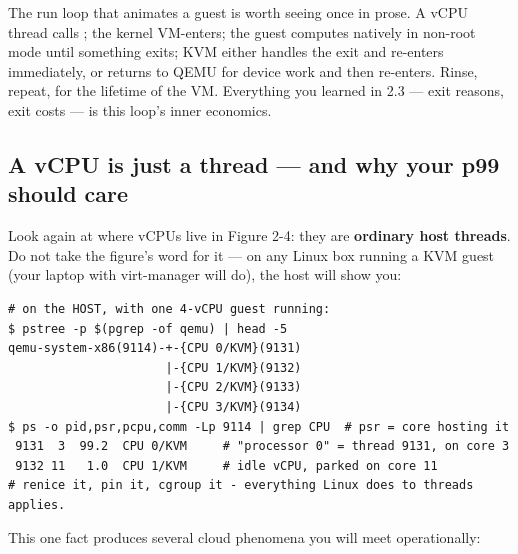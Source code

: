 The run loop that animates a guest is worth seeing once in prose. A vCPU thread calls ; the kernel VM-enters; the guest computes natively in non-root mode until something exits; KVM either handles the exit and re-enters immediately, or returns to QEMU for device work and then re-enters. Rinse, repeat, for the lifetime of the VM. Everything you learned in 2.3 — exit reasons, exit costs — is this loop's inner economics.

\subsection*{A vCPU is just a thread — and why your p99 should care}

Look again at where vCPUs live in Figure 2-4: they are \textbf{ordinary host threads}. Do not take the figure's word for it — on any Linux box running a KVM guest (your laptop with virt-manager will do), the host will show you:

\begin{terminalbox}
\begin{Verbatim}[breaklines=true,breakanywhere=true,fontsize=\small,formatcom=\color{tbbtermfg},codes=\tbbcodeactive]
# on the HOST, with one 4-vCPU guest running:
$ pstree -p $(pgrep -of qemu) | head -5
qemu-system-x86(9114)-+-{CPU 0/KVM}(9131)
                      |-{CPU 1/KVM}(9132)
                      |-{CPU 2/KVM}(9133)
                      |-{CPU 3/KVM}(9134)
$ ps -o pid,psr,pcpu,comm -Lp 9114 | grep CPU  # psr = core hosting it
 9131  3  99.2  CPU 0/KVM     # "processor 0" = thread 9131, on core 3
 9132 11   1.0  CPU 1/KVM     # idle vCPU, parked on core 11
# renice it, pin it, cgroup it - everything Linux does to threads applies.
\end{Verbatim}
\end{terminalbox}

This one fact produces several cloud phenomena you will meet operationally:

